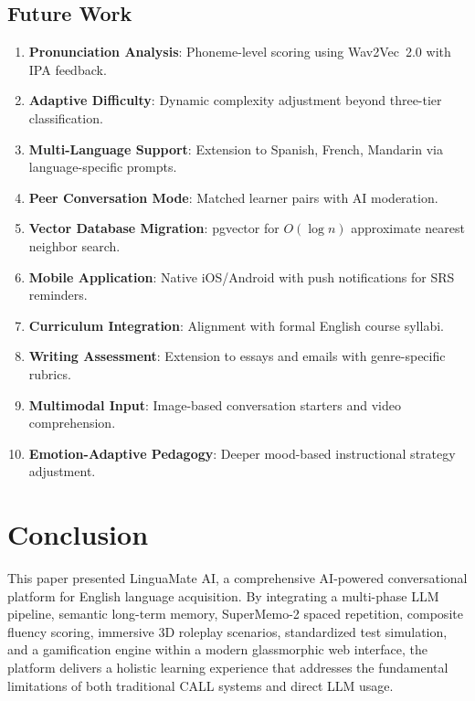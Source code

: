 \documentclass[conference]{IEEEtran}
\begin{document}
\subsection{Future Work}

\begin{enumerate}[leftmargin=*]
    \item \textbf{Pronunciation Analysis}: Phoneme-level scoring using Wav2Vec~2.0 with IPA feedback.
    \item \textbf{Adaptive Difficulty}: Dynamic complexity adjustment beyond three-tier classification.
    \item \textbf{Multi-Language Support}: Extension to Spanish, French, Mandarin via language-specific prompts.
    \item \textbf{Peer Conversation Mode}: Matched learner pairs with AI moderation.
    \item \textbf{Vector Database Migration}: pgvector for $O(\log n)$ approximate nearest neighbor search.
    \item \textbf{Mobile Application}: Native iOS/Android with push notifications for SRS reminders.
    \item \textbf{Curriculum Integration}: Alignment with formal English course syllabi.
    \item \textbf{Writing Assessment}: Extension to essays and emails with genre-specific rubrics.
    \item \textbf{Multimodal Input}: Image-based conversation starters and video comprehension.
    \item \textbf{Emotion-Adaptive Pedagogy}: Deeper mood-based instructional strategy adjustment.
\end{enumerate}

\section{Conclusion}

This paper presented LinguaMate AI, a comprehensive AI-powered conversational platform for English language acquisition. By integrating a multi-phase LLM pipeline, semantic long-term memory, SuperMemo-2 spaced repetition, composite fluency scoring, immersive 3D roleplay scenarios, standardized test simulation, and a gamification engine within a modern glassmorphic web interface, the platform delivers a holistic learning experience that addresses the fundamental limitations of both traditional CALL systems and direct LLM usage.
\end{document}
